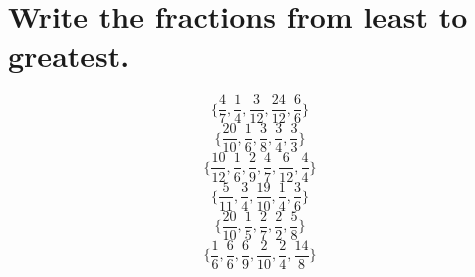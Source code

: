 \documentclass[12pt, fleqn, leqno]{article}
\begin{document}
\section*{Write the fractions from least to greatest.}
\thispagestyle{plain}
        \begin{equation}\{\frac{4}{7}, \frac{1}{4}, \frac{3}{12}, \frac{24}{12}, \frac{6}{6}\}\end{equation}
        \vspace{4cm}
        \begin{equation}\{\frac{20}{10}, \frac{1}{6}, \frac{3}{8}, \frac{3}{4}, \frac{3}{3}\}\end{equation}
        \vspace{4cm}
        \begin{equation}\{\frac{10}{12}, \frac{1}{6}, \frac{2}{9}, \frac{4}{7}, \frac{6}{12}, \frac{4}{4}\}\end{equation}
        \vspace{4cm}
        \begin{equation}\{\frac{5}{11}, \frac{3}{4}, \frac{19}{10}, \frac{1}{4}, \frac{3}{6}\}\end{equation}
        \vspace{4cm}
        \begin{equation}\{\frac{20}{10}, \frac{1}{5}, \frac{2}{7}, \frac{2}{2}, \frac{5}{8}\}\end{equation}
        \vspace{4cm}
        \begin{equation}\{\frac{1}{6}, \frac{6}{6}, \frac{6}{9}, \frac{2}{10}, \frac{2}{4}, \frac{14}{8}\}\end{equation}
        \vspace{4cm}
\newpage

    
\end{document}
